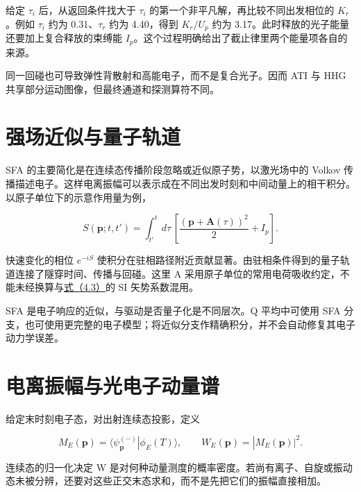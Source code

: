 \documentclass[UTF8,a4paper,zihao=-4,openany,fontset=fandol]{ctexbook}
\begin{document}
给定 $\tau_i$ 后，从返回条件找大于 $\tau_i$ 的第一个非平凡解，再比较不同出发相位的 $K_r$。例如 $\tau_i$ 约为 0.31、$\tau_r$ 约为 4.40，得到 $K_r/U_p$ 约为 3.17。此时释放的光子能量还要加上复合释放的束缚能 $I_p$。这个过程明确给出了截止律里两个能量项各自的来源。



同一回碰也可导致弹性背散射和高能电子，而不是复合光子。因而 ATI 与 HHG 共享部分运动图像，但最终通道和探测算符不同。



\section{强场近似与量子轨道}\label{sec:04:5}


SFA 的主要简化是在连续态传播阶段忽略或近似原子势，以激光场中的 Volkov 传播描述电子。这样电离振幅可以表示成在不同出发时刻和中间动量上的相干积分。以原子单位下的示意作用量为例，



\begin{equation*}
S(\mathbf p;t,t')=\int_{t'}^t d\tau\,
\left[\frac{(\mathbf p+\mathbf A(\tau))^2}{2}+I_p\right].
\tag{4.4}\label{eq:4.4}
\end{equation*}


快速变化的相位 $e^{-iS}$ 使积分在驻相路径附近贡献显著。由驻相条件得到的量子轨道连接了隧穿时间、传播与回碰。这里 A 采用原子单位的常用电荷吸收约定，不能未经换算与\hyperref[eq:4.3]{式（4.3）}的 SI 矢势系数混用。



SFA 是电子响应的近似，与驱动是否量子化是不同层次。Q 平均中可使用 SFA 分支，也可使用更完整的电子模型；将近似分支作精确积分，并不会自动修复其电子动力学误差。



\section{电离振幅与光电子动量谱}\label{sec:04:6}


给定末时刻电子态，对出射连续态投影，定义



\begin{equation*}
M_E(\mathbf p)=\langle\psi_{\mathbf p}^{(-)}|\phi_E(T)\rangle,
\qquad W_E(\mathbf p)=|M_E(\mathbf p)|^2.
\tag{4.5}\label{eq:4.5}
\end{equation*}


连续态的归一化决定 W 是对何种动量测度的概率密度。若尚有离子、自旋或振动态未被分辨，还要对这些正交末态求和，而不是先把它们的振幅直接相加。
\end{document}
